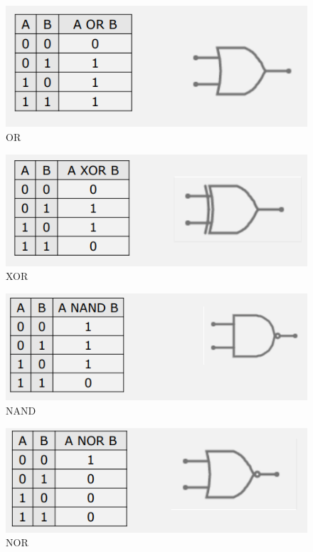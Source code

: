 \documentclass{article}
\begin{document}
\begin{figure}[h]
  \centering
  \includegraphics[scale=0.7]{IM_OR}
  \caption{OR}
  \label{OR}
\end{figure}

\begin{figure}[h]
  \centering
  \includegraphics[scale=0.7]{IM_XOR}
  \caption{XOR}
  \label{XOR}
\end{figure}


\begin{figure}[h]
  \centering
  \includegraphics[scale=0.7]{IM_NAND}
  \caption{NAND}
  \label{NAND}
\end{figure}

\begin{figure}[h]
  \centering
  \includegraphics[scale=0.7]{IM_NOR}
  \caption{NOR}
  \label{NOR}
\end{figure}
\end{document}
